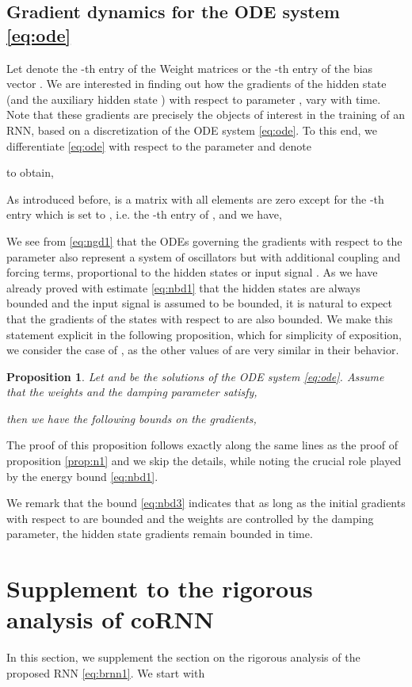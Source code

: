 \documentclass{article} \usepackage{iclr2021_conference,times}
\newtheorem{proposition}[theorem]{Proposition}
\begin{document}
\subsection{Gradient dynamics for the ODE system \eqref{eq:ode}}
\label{sec:gd}
Let  denote the -th entry of the Weight matrices  or the -th entry of the bias vector . We are interested in finding out how the gradients of the hidden state  (and the auxiliary hidden state ) with respect to parameter , vary with time. Note that these gradients are precisely the objects of interest in the training of an RNN, based on a discretization of the ODE system \eqref{eq:ode}. To this end, we differentiate \eqref{eq:ode} with respect to the parameter  and denote 

to obtain,

As introduced before,  is a matrix with all elements are zero except for the -th entry which is set to , i.e. the -th entry of , and we have,

We see from \eqref{eq:ngd1} that the ODEs governing the gradients with respect to the parameter  also represent a system of oscillators but with additional coupling and forcing terms, proportional to the hidden states  or input signal . As we have already proved with estimate \eqref{eq:nbd1} that the hidden states are always bounded and the input signal is assumed to be bounded, it is natural to expect that the gradients of the states with respect to  are also bounded. We make this statement explicit in the following proposition, which for simplicity of exposition, we consider the case of , as the other values of  are very similar in their behavior.
\begin{proposition}
\label{prop:n3_cont}
Let  and  be the solutions of the ODE system \eqref{eq:ode}. Assume that the weights and the damping parameter satisfy, 

then we have the following bounds on the gradients,

\end{proposition}
The proof of this proposition follows exactly along the same lines as the proof of proposition \ref{prop:n1} and we skip the details, while noting the crucial role played by the energy bound \eqref{eq:nbd1}. 

We remark that the bound \eqref{eq:nbd3} indicates that as long as the initial gradients with respect to  are bounded and the weights are controlled by the damping parameter, the hidden state gradients remain bounded in time. 


\section{Supplement to the rigorous analysis of coRNN}
In this section, we supplement the section on the rigorous analysis of the proposed RNN \eqref{eq:brnn1}. We start with 
\end{document}
